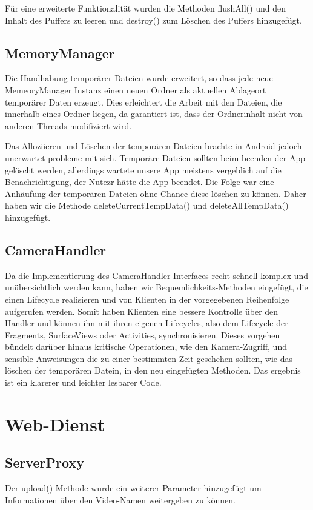 Für eine erweiterte Funktionalität wurden die Methoden flushAll() und den Inhalt des Puffers zu leeren und destroy() zum Löschen des Puffers hinzugefügt.

\subsection{MemoryManager} \label{MemoryManager}
Die Handhabung temporärer Dateien wurde erweitert, so dass jede neue MemeoryManager Instanz einen neuen Ordner als aktuellen Ablageort temporärer Daten erzeugt. Dies erleichtert die Arbeit mit den Dateien, die innerhalb eines Ordner liegen, da garantiert ist, dass der Ordnerinhalt nicht von anderen Threads modifiziert wird. \par
Das Alloziieren und Löschen der temporären Dateien brachte in Android jedoch unerwartet probleme mit sich. Temporäre Dateien sollten beim beenden der App gelöscht werden, allerdings wartete unsere App meistens vergeblich auf die Benachrichtigung, der Nutezr hätte die App beendet. Die Folge war eine Anhäufung der temporären Dateien ohne Chance diese löschen zu können. Daher haben wir die Methode deleteCurrentTempData() und deleteAllTempData() hinzugefügt. \par

\subsection{CameraHandler} \label{CameraHandler}
Da die Implementierung des CameraHandler Interfaces recht schnell komplex und unübersichtlich werden kann, haben wir Bequemlichkeits-Methoden eingefügt, die einen Lifecycle realisieren und von Klienten in der vorgegebenen Reihenfolge aufgerufen werden. Somit haben Klienten eine bessere Kontrolle über den Handler und können ihn mit ihren eigenen Lifecycles, also dem Lifecycle der Fragments, SurfaceViews oder Activities, synchronisieren. Dieses vorgehen bündelt darüber hinaus kritische Operationen, wie den Kamera-Zugriff, und sensible Anweisungen die zu einer bestimmten Zeit geschehen sollten, wie das löschen der temporären Datein, in den neu eingefügten Methoden. Das ergebnis ist ein klarerer und leichter lesbarer Code.

\section{Web-Dienst}

\subsection{ServerProxy}
Der upload()-Methode wurde ein weiterer Parameter hinzugefügt um Informationen über den Video-Namen weitergeben zu können.  \par  

